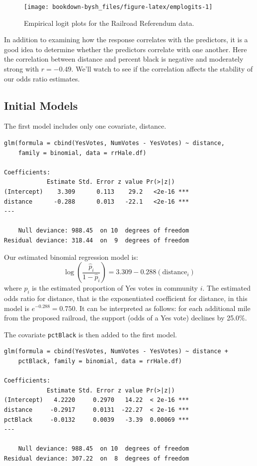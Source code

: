 \documentclass[
]{krantz}
\begin{document}
\begin{figure}

{\centering \texttt{[image: bookdown-bysh\_files/figure-latex/emplogits-1]} 

}

\caption{Empirical logit plots for the Railroad Referendum data.}\label{fig:emplogits}
\end{figure}

In addition to examining how the response correlates with the predictors, it is a good idea to determine whether the predictors correlate with one another. Here the correlation between distance and percent black is negative and moderately strong with \(r = -0.49\). We'll watch to see if the correlation affects the stability of our odds ratio estimates.

\hypertarget{initial-models-1}{%
\subsection{Initial Models}\label{initial-models-1}}

The first model includes only one covariate, distance.

\begin{verbatim}
glm(formula = cbind(YesVotes, NumVotes - YesVotes) ~ distance, 
    family = binomial, data = rrHale.df)

Coefficients:
            Estimate Std. Error z value Pr(>|z|)    
(Intercept)    3.309      0.113    29.2   <2e-16 ***
distance      -0.288      0.013   -22.1   <2e-16 ***
---

    Null deviance: 988.45  on 10  degrees of freedom
Residual deviance: 318.44  on  9  degrees of freedom
\end{verbatim}

Our estimated binomial regression model is:
\[\log\left(\frac{\hat{p}_i}{1-\hat{p}_i}\right)=3.309-0.288 (\textrm{distance}_i)\]
where \(\hat{p}_i\) is the estimated proportion of Yes votes in community \(i\). The estimated odds ratio for distance, that is the exponentiated coefficient for distance, in this model is \(e^{-0.288}=0.750\). It can be interpreted as follows: for each additional mile from the proposed railroad, the support (odds of a Yes vote) declines by 25.0\%.

The covariate \texttt{pctBlack} is then added to the first model.

\begin{verbatim}
glm(formula = cbind(YesVotes, NumVotes - YesVotes) ~ distance + 
    pctBlack, family = binomial, data = rrHale.df)

Coefficients:
            Estimate Std. Error z value Pr(>|z|)    
(Intercept)   4.2220     0.2970   14.22  < 2e-16 ***
distance     -0.2917     0.0131  -22.27  < 2e-16 ***
pctBlack     -0.0132     0.0039   -3.39  0.00069 ***
---

    Null deviance: 988.45  on 10  degrees of freedom
Residual deviance: 307.22  on  8  degrees of freedom
\end{verbatim}
\end{document}
